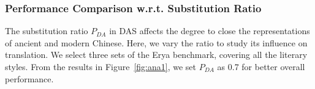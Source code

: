 

\subsubsection{Performance Comparison w.r.t. Substitution Ratio} \label{sec:pda}
The substitution ratio $P_{DA}$ in DAS affects the degree to close the representations of ancient and modern Chinese. 
Here, we vary the ratio to study its influence on translation. We select three sets of the Erya benchmark, covering all the literary styles. From the results in Figure~\ref{fig:ana1}, we set $P_{DA}$ as 0.7 for better overall performance.



